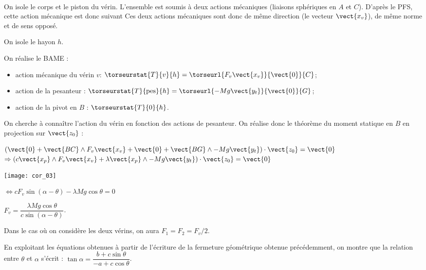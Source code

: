 \ifprof
\begin{corrige}~\\
On isole le corps et le piston du vérin. L'ensemble est soumis à deux actions mécaniques (liaisons sphériques en $A$ et $C$). D'après le PFS, cette action mécanique est donc suivant Ces deux actions mécaniques sont donc de même direction (le vecteur $\vect{x_v}$), de même norme et de sens opposé. 

On isole le hayon $h$. 

On réalise le BAME : 
\begin{itemize}
\item action mécanique du vérin $v$: $\torseurstat{T}{v}{h}=\torseurl{F_v\vect{x_v}}{\vect{0}}{C}$;
\item action de la pesanteur : $\torseurstat{T}{\text{pes}}{h}=\torseurl{-Mg\vect{y_t}}{\vect{0}}{G}$;
\item action de la pivot en $B$ : $\torseurstat{T}{\text{0}}{h}$.
\end{itemize}

On cherche à connaître l'action du vérin en fonction des actions de pesanteur. On réalise donc le théorème du moment statique en $B$ en projection sur $\vect{z_0}$ : 

$ \left( 
\vect{0} + \vect{BC}\wedge F_v\vect{x_v}
+ \vect{0} + \vect{BG}\wedge -Mg\vect{y_t}
\right) \cdot \vect {z_0} = \vect{0} $
$\Rightarrow \left( c\vect{x_p}\wedge F_v\vect{x_v} + \lambda \vect{x_p}\wedge -Mg\vect{y_t}
\right) \cdot \vect {z_0} = \vect{0} $

\begin{center}
\texttt{[image: cor\_03]}

$\Leftrightarrow  c F_v\sin \left( \alpha - \theta\right) - \lambda Mg\cos \theta  = {0} $

$   F_v = \dfrac{\lambda Mg\cos \theta}{c\sin \left( \alpha - \theta\right)} $.

Dans le cas où on considère les deux vérins, on aura $F_1=F_2=F_v/2$.

\end{center}


\end{corrige}


\else
\fi

\ifprof
\else
En exploitant les équations obtenues à partir de l’écriture de la fermeture géométrique obtenue précédemment, on montre que la relation entre $\theta$ et $\alpha$ s’écrit : 
$ \tan \alpha = \dfrac{b+c\sin\theta}{-a+c\cos\theta}$.


